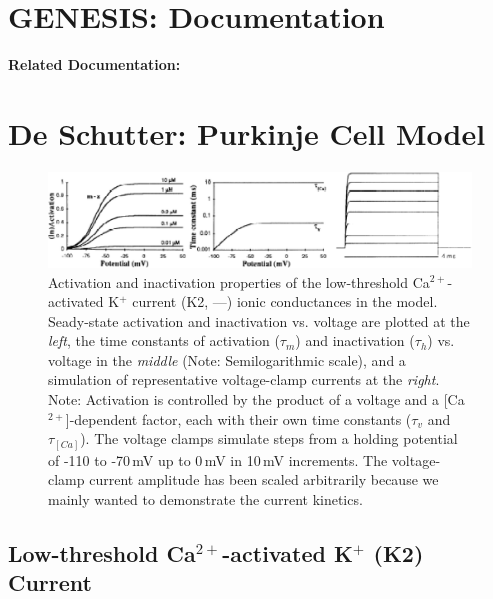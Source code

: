 \documentclass[12pt]{article}
\begin{document}
\section*{GENESIS: Documentation}

{\bf Related Documentation:}

\section*{De Schutter: Purkinje Cell Model}

\begin{figure}[h]
\centering
   \includegraphics[scale=0.75]{figures/DS1.2H.eps}
   \caption{Activation and inactivation properties of the low-threshold Ca$^{2+}$-activated K$^+$ current (K2, ---) ionic conductances in the model. Seady-state activation and inactivation vs. voltage are plotted at the {\em left}, the time constants of activation ($\tau_m$) and inactivation ($\tau_h$) vs. voltage in the {\em middle} (Note: Semilogarithmic scale), and a simulation of representative voltage-clamp currents at the {\em right}. Note: Activation is controlled by the product of a voltage and a [Ca$^{2+}$]-dependent factor, each with their own time constants ($\tau_v$ and $\tau_{[Ca]}$). The voltage clamps simulate steps from a holding potential of -110 to -70\,mV up to 0\,mV in 10\,mV increments. The voltage-clamp current amplitude has been scaled arbitrarily because we mainly wanted to demonstrate the current kinetics.}
   \label{fig:DS1.2H}
\end{figure}

\subsection*{Low-threshold Ca$^{2+}$-activated K$^+$ (K2) Current}
\end{document}
